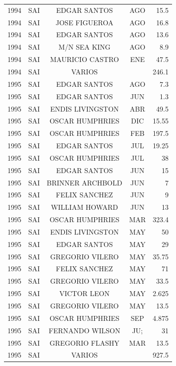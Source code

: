 \documentclass[12pt,]{article}
\begin{document}
\begin{table}[ht]
{\begin{tabular}{lcccr}
  1994 & SAI & EDGAR SANTOS & AGO & 15.5 \\ 
  1994 & SAI & JOSE FIGUEROA & AGO & 16.8 \\ 
  1994 & SAI & EDGAR SANTOS & AGO & 13.6 \\ 
  1994 & SAI & M/N SEA KING & AGO & 8.9 \\ 
  1994 & SAI & MAURICIO CASTRO & ENE & 47.5 \\ 
  1994 & SAI & VARIOS &  & 246.1 \\ 
  1995 & SAI & EDGAR SANTOS & AGO & 7.3 \\ 
  1995 & SAI & EDGAR SANTOS & JUN & 1.3 \\ 
  1995 & SAI & ENDIS LIVINGSTON & ABR & 49.5 \\ 
  1995 & SAI & OSCAR HUMPHRIES & DIC & 15.55 \\ 
  1995 & SAI & OSCAR HUMPHRIES & FEB & 197.5 \\ 
  1995 & SAI & EDGAR SANTOS & JUL & 19.25 \\ 
  1995 & SAI & OSCAR HUMPHRIES & JUL & 38 \\ 
  1995 & SAI & EDGAR SANTOS & JUN & 15 \\ 
  1995 & SAI & BRINNER ARCHBOLD & JUN & 7 \\ 
  1995 & SAI & FELIX SANCHEZ & JUN & 9 \\ 
  1995 & SAI & WILLIAM HOWARD & JUN & 13 \\ 
  1995 & SAI & OSCAR HUMPHRIES & MAR & 323.4 \\ 
  1995 & SAI & ENDIS LIVINGSTON & MAY & 50 \\ 
  1995 & SAI & EDGAR SANTOS & MAY & 29 \\ 
  1995 & SAI & GREGORIO VILERO & MAY & 35.75 \\ 
  1995 & SAI & FELIX SANCHEZ & MAY & 71 \\ 
  1995 & SAI & GREGORIO VILERO & MAY & 33.5 \\ 
  1995 & SAI & VICTOR LEON & MAY & 2.625 \\ 
  1995 & SAI & GREGORIO VILERO & MAY & 13.5 \\ 
  1995 & SAI & OSCAR HUMPHRIES & SEP & 4.875 \\ 
  1995 & SAI & FERNANDO WILSON & JU; & 31 \\ 
  1995 & SAI & GREGORIO FLASHY & MAR & 13.5 \\ 
  1995 & SAI & VARIOS &  & 927.5 \\ 
   \hline
\end{tabular}
}
\end{table}
\end{document}
